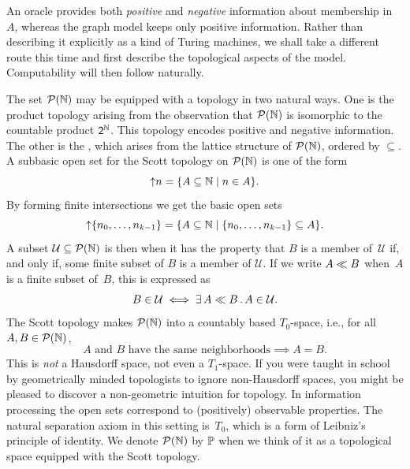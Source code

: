 An oracle provides both \emph{positive} and \emph{negative}
information about membership in~$A$, whereas the graph model keeps
only positive information. Rather than describing it explicitly as a
kind of Turing machines, we shall take a different route this time and
first describe the topological aspects of the model. Computability
will then follow naturally.

The set $\mathcal{P}(\mathbb{N})$ may be equipped with a topology in two natural
ways. One is the product topology arising from the observation that
$\mathcal{P}(\mathbb{N})$ is isomorphic to the countable product $\mathsf{2}^{\mathbb{N}}$. This
topology encodes positive and negative information. The other is the
, which arises from the lattice structure of
$\mathcal{P}(\mathbb{N})$, ordered by $\subseteq$. A subbasic open set for the Scott
topology on $\mathcal{P}(\mathbb{N})$ is one of the form
%
\begin{equation*}
  {\uparrow}n = \{A \subseteq \mathbb{N} \mid n \in A\}.
\end{equation*}
%
By forming finite intersections we get the basic open sets
%
\begin{equation*}
  {\uparrow}\{n_0, \ldots, n_{k-1}\} =
  \{A \subseteq \mathbb{N} \mid \{n_0, \ldots, n_{k-1}\} \subseteq A\}.
\end{equation*}
%
A subset $\mathcal{U} \subseteq \mathcal{P}(\mathbb{N})$ is then 
when it has the property that $B$ is a member of~$\mathcal{U}$ if, and
only if, some finite subset of $B$ is a member of $\mathcal{U}$. If we
write $A \ll B$ when~$A$ is a finite subset of~$B$, this is
expressed as
%
\begin{equation*}
  B \in \mathcal{U} \iff \exists\, A \ll B\,.\,A \in \mathcal{U}.
\end{equation*}
%
The Scott topology makes $\mathcal{P}(\mathbb{N})$ into a countably based
$T_0$-space, i.e., for all $A, B \in \mathcal{P}(\mathbb{N})$,
%
\begin{equation*}
  \text{$A$ and $B$ have the same neighborhoods} \implies A = B.
\end{equation*}
%
This is \emph{not} a Hausdorff space, not even a $T_1$-space. If you
were taught in school by geometrically minded topologists to ignore
non-Hausdorff spaces, you might be pleased to discover a non-geometric
intuition for topology. In information processing the open sets
correspond to (positively) observable properties. The natural
separation axiom in this setting is~$T_0$, which is a form of
Leibniz's principle of identity. We
denote $\mathcal{P}(\mathbb{N})$ by $\mathbb{P}$ when we think of it as a topological
space equipped with the Scott topology.

